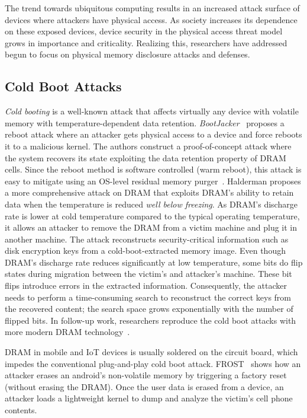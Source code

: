 The trend towards ubiquitous computing results in an increased attack surface of devices where attackers have physical access.
As society increases its dependence on these exposed devices, device security in the physical access threat model grows in importance and criticality.
Realizing this, researchers have addressed begun to focus on physical memory disclosure attacks and defenses. 

\subsection{Cold Boot Attacks}

\textit{Cold booting} is a well-known attack that affects virtually any device with volatile memory with temperature-dependent data retention.
\textit{BootJacker}~\cite{chan_bootjacker_2008} proposes a reboot attack where an attacker gets physical access to a device and force reboots it to a malicious kernel. 
The authors construct a proof-of-concept attack where the system recovers its state exploiting the data retention property of DRAM cells. 
Since the reboot method is software controlled (\ie warm reboot), this attack is easy to mitigate using an OS-level residual memory purger~\cite{computing2009tcg}.
Halderman \etal \cite{halderman2009lest} proposes a more comprehensive attack on DRAM that exploits DRAM's ability to retain data when the temperature is reduced \textit{well below freezing}.  
As DRAM's discharge rate is lower at cold temperature compared to the typical operating temperature, it allows an attacker to remove the DRAM from a victim machine and plug it in another machine. 
The attack reconstructs security-critical information such as disk encryption keys from a cold-boot-extracted memory image. 
Even though DRAM's discharge rate reduces significantly at low temperature, some bits do flip states during migration between the victim's and attacker's machine.
These bit flips introduce errors in the extracted information. 
Consequently, the attacker needs to perform a time-consuming search to reconstruct the correct keys from the recovered content; the search space grows exponentially with the number of flipped bits. 
In follow-up work, researchers reproduce the cold boot attacks with more modern DRAM technology~\cite{lindenlauf2015cold,bauer2016lest}.

DRAM in mobile and IoT devices is usually soldered on the circuit board, which impedes the conventional plug-and-play cold boot attack. 
FROST~\cite{frost_2013} shows how an attacker erases an android's non-volatile memory by triggering a factory reset (without erasing the DRAM). 
Once the user data is erased from a device, an attacker loads a lightweight kernel to dump and analyze the victim's cell phone contents.



